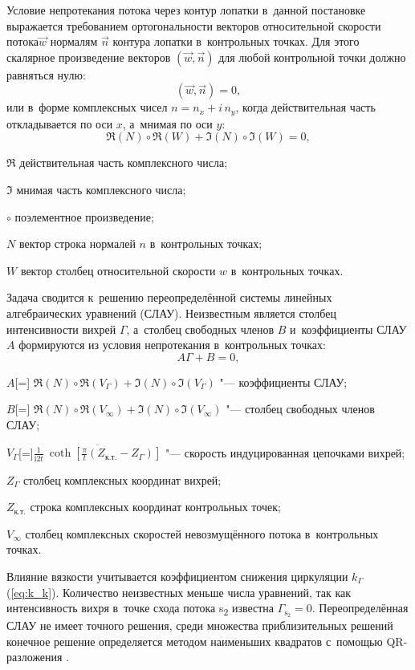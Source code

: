 Условие непротекания потока через контур лопатки в~данной постановке выражается требованием ортогональности векторов относительной скорости потока\(\vec{w}\) нормалям \(\vec{n}\) контура лопатки в~контрольных точках.
Для этого скалярное произведение векторов \(\left(\vec{w}, \vec{n}\right)\) для любой контрольной точки должно равняться нулю:
\begin{equation}
	\left(\vec{w}, \vec{n}\right) = 0,
\end{equation}
или в~форме комплексных чисел \(n=n_x + i\,n_y\), когда действительная часть откладывается по оси \(x\), а~мнимая по оси \(y\):
\begin{equation}
	\Re({N}) \circ \Re({W}) + \Im({N}) \circ \Im({W}) = 0,
\end{equation}
\begin{eqexpl}
    \item{\(\Re\)} действительная часть комплексного числа;
    \item{\(\Im\)} мнимая часть комплексного числа;
    \item{\(\circ\)} поэлементное произведение;
	\item{\({N}\)} вектор строка нормалей \(n\) в~контрольных точках;
	\item{\({W}\)} вектор столбец относительной скорости \({w}\) в~контрольных точках.
\end{eqexpl}

Задача сводится к~решению переопределённой системы линейных алгебраических уравнений (СЛАУ).
Неизвестным является столбец интенсивности вихрей \({\Gamma}\), а~столбец свободных членов \({B}\) и~коэффициенты СЛАУ \({A}\) формируются из условия непротекания в~контрольных точках:
\begin{equation}
	{A}{\Gamma}+{B}=0,
	\label{eq:SLAU}
\end{equation}
\begin{eqexpl}
	\item{\({A}\)}[=] \(\Re({N}) \circ \Re({V}_{\Gamma}) + \Im({N}) \circ \Im({V}_{\Gamma})\) "--- коэффициенты СЛАУ;
	\item{\({B}\)}[=] \(\Re({N}) \circ \Re({V}_{\infty}) + \Im({N}) \circ \Im({V}_{\infty})\) "--- столбец свободных членов СЛАУ;
	\item{\({V}_{\Gamma}\)}[=]\(\overline{\frac{1}{\mathrm{i} 2 t}~\coth \left[ \frac{\pi}{t} ({Z}_\text{к.т.}-{Z}_{\Gamma}) \right]}\) "--- скорость индуцированная цепочками вихрей;
	\item{\({Z}_{\Gamma}\)} столбец комплексных координат вихрей;
	\item{\({Z}_\text{к.т.}\)} строка комплексных координат контрольных точек;
	\item{\({V}_{\infty}\)} столбец комплексных скоростей невозмущённого потока в~контрольных точках.
\end{eqexpl}
Влияние вязкости учитывается коэффициентом снижения циркуляции \(k_\Gamma\) (\ref{eq:k_k}).
Количество неизвестных меньше числа уравнений, так как интенсивность вихря в~точке схода потока s\textsubscript{2} известна \(\Gamma_{\text{s}_2} = 0\).
Переопределённая СЛАУ не имеет точного решения, среди множества приблизительных решений конечное решение определяется методом наименьших квадратов с~помощью QR-разложения \autocite{Horn1990}.

